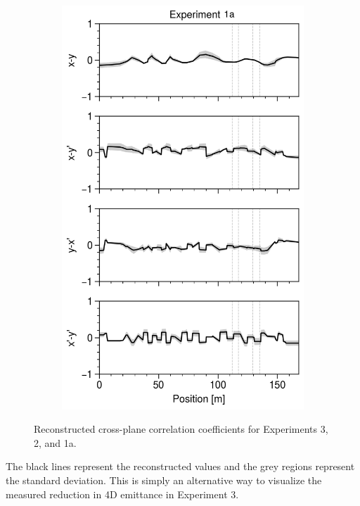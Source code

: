 \begin{figure}[!p]
\begin{subfigure}{0.32\textwidth}
        \includegraphics[width=\textwidth]{Images/chapter5/exp1a/compare_corr.png}
    \end{subfigure}
    \caption{Reconstructed cross-plane correlation coefficients for Experiments 3, 2, and 1a.}
    \label{fig:exp3_compare_corr}
    \vspace*{3.0cm}
\end{figure}
% 
The black lines represent the reconstructed values and the grey regions represent the standard deviation. This is simply an alternative way to visualize the measured reduction in 4D emittance in Experiment 3.

